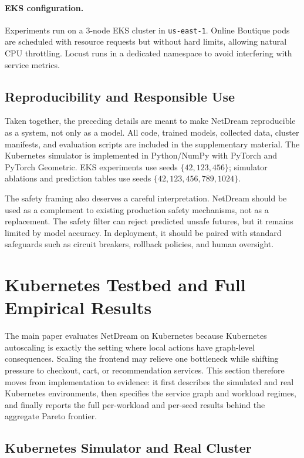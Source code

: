 \paragraph{EKS configuration.}
Experiments run on a 3-node EKS cluster in \texttt{us-east-1}.  Online
Boutique pods are scheduled with resource requests but without hard
limits, allowing natural CPU throttling.  Locust runs in a dedicated
namespace to avoid interfering with service metrics.

\subsection{Reproducibility and Responsible Use}
\label{app:release-impact}

Taken together, the preceding details are meant to make NetDream
reproducible as a system, not only as a model.  All code, trained models,
collected data, cluster manifests, and evaluation scripts are included in
the supplementary material.  The Kubernetes simulator is implemented in
Python/NumPy with PyTorch and PyTorch Geometric.  EKS experiments use
seeds $\{42,123,456\}$; simulator ablations and prediction tables use
seeds $\{42,123,456,789,1024\}$.

The safety framing also deserves a careful interpretation.  NetDream
should be used as a complement to existing production safety mechanisms,
not as a replacement.  The safety filter can reject predicted unsafe
futures, but it remains limited by model accuracy.  In deployment, it
should be paired with standard safeguards such as circuit breakers,
rollback policies, and human oversight.

\section{Kubernetes Testbed and Full Empirical Results}
\label{app:k8s-full}

The main paper evaluates NetDream on Kubernetes because Kubernetes
autoscaling is exactly the setting where local actions have graph-level
consequences.  Scaling the frontend may relieve one bottleneck while
shifting pressure to checkout, cart, or recommendation services.  This
section therefore moves from implementation to evidence: it first
describes the simulated and real Kubernetes environments, then specifies
the service graph and workload regimes, and finally reports the full
per-workload and per-seed results behind the aggregate Pareto frontier.

\subsection{Kubernetes Simulator and Real Cluster}
\label{app:k8s-sim}


